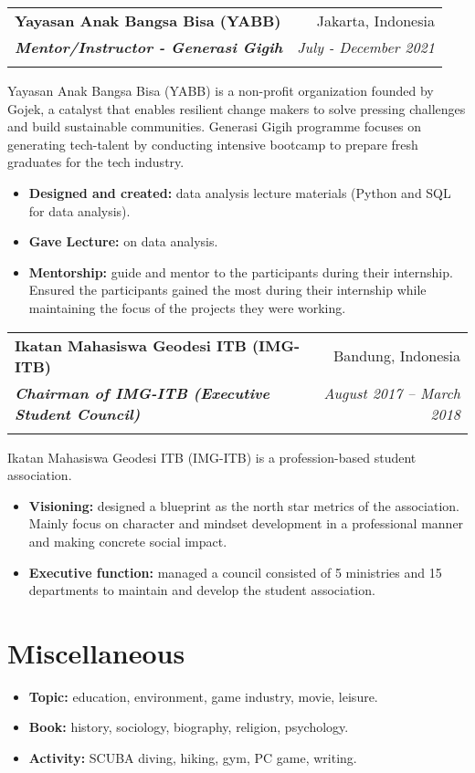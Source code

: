 \documentclass[a4paper, 11pt]{article}
\makeatletter
\newcommand{\resumeItem}[2]{
    \item\small{
        \textbf{#1}{#2 \vspace{-2pt}}
    }
}
\newcommand{\resumeSubheading}[4]{
    \vspace{-1pt}
    \begin{tabular*}{0.97\textwidth}{l@{\extracolsep{\fill}}r}
        \color{lightblue}\textbf{#1} & #2 \\
        \textbf{\textit{\small#3}} & \textit{\small #4} \\
        \textnormal{}\vspace{-5pt}
    \end{tabular*}\vspace{-5pt}
}
\newcommand{\resumeItemListStart}{\begin{itemize}[leftmargin=*]\setlength\itemsep{0em}\vspace{-1pt}}
\newcommand{\resumeItemListEnd}{\end{itemize}\vspace{-5pt}}
\makeatother
\begin{document}
    \resumeSubheading
    {Yayasan Anak Bangsa Bisa (YABB)}
    {Jakarta, Indonesia}
    {Mentor/Instructor - Generasi Gigih}
    {July - December 2021}
    {Yayasan Anak Bangsa Bisa (YABB) is a non-profit organization founded by Gojek, a catalyst that enables resilient change makers to
    solve pressing challenges and build sustainable communities. Generasi Gigih programme focuses on generating tech-talent by
    conducting intensive bootcamp to prepare fresh graduates for the tech industry.}
    \vspace{-5pt}
    \resumeItemListStart
    \resumeItem{Designed and created:}{ data analysis lecture materials (Python and SQL for data analysis).}
    \resumeItem{Gave Lecture:}{ on data analysis.}
    \resumeItem{Mentorship:}{ guide and mentor to the participants during their internship. Ensured the participants gained the most during their
    internship while maintaining the focus of the projects they were working.}
    \resumeItemListEnd

    \vspace{5pt}
    \resumeSubheading
    {Ikatan Mahasiswa Geodesi ITB (IMG-ITB)}
    {Bandung, Indonesia}
    {Chairman of IMG-ITB (Executive Student Council)}
    {August 2017 – March 2018}
    {Ikatan Mahasiswa Geodesi ITB (IMG-ITB) is a profession-based student association.}
    \vspace{-5pt}
    \resumeItemListStart
    \resumeItem{Visioning:}{ designed a blueprint as the north star metrics of the association. Mainly focus on character and mindset development in a
    professional manner and making concrete social impact.}
    \resumeItem{Executive function:}{ managed a council consisted of 5 ministries and 15 departments to maintain and develop the student association.}
    \resumeItemListEnd

    \vspace{-5pt}
    \section{Miscellaneous}

    \resumeItemListStart
    \resumeItem{Topic:}{ education, environment, game industry, movie, leisure.}
    \resumeItem{Book:}{ history, sociology, biography, religion, psychology.}
    \resumeItem{Activity:}{ SCUBA diving, hiking, gym, PC game, writing.}
    \resumeItemListEnd
\end{document}

